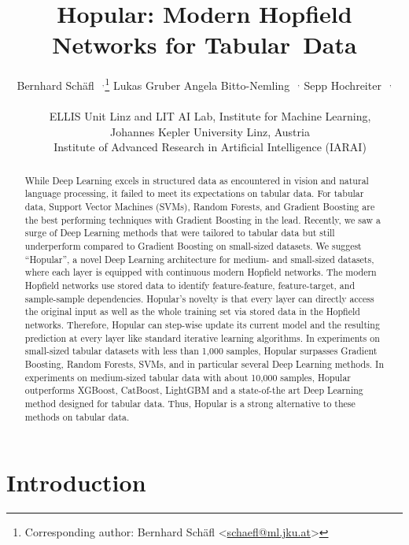 \documentclass{article}
\title{Hopular: Modern Hopfield Networks for \mbox{Tabular Data}}
\author{
    Bernhard Sch\"{a}fl\footnotemark[2]~$~^{,}$\thanks{Corresponding author: Bernhard Sch\"{a}fl <\href{mailto:schaefl@ml.jku.at}{schaefl@ml.jku.at}>} \quad
    Lukas Gruber\footnotemark[2] \quad
    Angela Bitto-Nemling\footnotemark[2]~$~^{,}$\footnotemark[3] \quad
    Sepp Hochreiter\footnotemark[2]~$~^{,}$\footnotemark[3]\\ \\
  \footnotemark[2]~~ELLIS Unit Linz and LIT AI Lab, Institute for Machine Learning,\\
                  ~~Johannes Kepler University Linz, Austria\\
  \footnotemark[3]~~Institute of Advanced Research in 
  Artificial Intelligence (IARAI)
}
\theoremstyle{plain}
\theoremstyle{definition}
\theoremstyle{remark}
\begin{document}
\maketitle

\begin{abstract}
    While Deep Learning excels in structured data as encountered in vision and
    natural language processing, it failed to meet its expectations on tabular data.
    For tabular data, Support Vector Machines (SVMs), Random Forests,
    and Gradient Boosting are the best performing techniques with Gradient Boosting in the lead.
    Recently, we saw a surge of Deep Learning methods that were tailored to tabular data
    but still underperform compared to Gradient Boosting on small-sized datasets.
    We suggest ``Hopular'', a novel Deep Learning architecture for medium- and
    small-sized datasets,
    where each layer is
    equipped with continuous modern Hopfield networks. The modern Hopfield networks
    use stored data to identify feature-feature, 
    feature-target, and sample-sample dependencies.
    Hopular's novelty is that every layer can directly access 
    the original input as well as the whole training set 
    via stored data in the Hopfield networks.
    Therefore, 
    Hopular can step-wise update its current model and the resulting 
    prediction at every layer 
    like standard iterative learning algorithms.
    In experiments on small-sized tabular datasets with less than 1,000 samples,
    Hopular surpasses Gradient Boosting, Random Forests, SVMs,
    and in particular several Deep Learning methods.
    In experiments on medium-sized tabular data with about 10,000 samples,
    Hopular outperforms XGBoost, CatBoost, LightGBM and 
    a state-of-the art Deep Learning method designed for tabular data.
    Thus, Hopular is a strong alternative to these methods on tabular data.
\end{abstract}


\section{Introduction}
\end{document}
